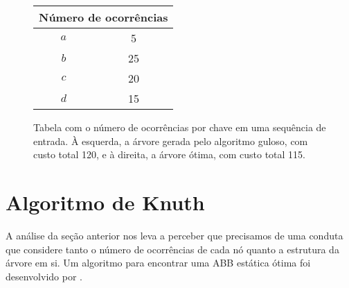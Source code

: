 \begin{figure}[h]
  \centering
  \begin{minipage}[c]{0.35\textwidth}
    \centering
    \begin{tabular}{|c|c|}
    \hline
    \multicolumn{2}{|c|}{\textbf{Número de ocorrências}} \\
    \hline
    \textbf{$a$} & 5 \\
    $b$ & 25 \\
    $c$ & 20 \\
    $d$ & 15 \\
    \hline
    \end{tabular}
    \end{minipage}
  \begin{minipage}[c]{0.3\textwidth}
  \centering
  \end{minipage}
  \begin{minipage}[c]{0.3\textwidth}
  \centering
  \end{minipage}
  \caption{Tabela com o número de ocorrências por chave em uma sequência de entrada. À esquerda, a árvore gerada pelo algoritmo guloso, com custo total 120, e à direita, a árvore ótima, com custo total 115.}
\label{fig:caso-guloso-subotimo}
\end{figure}

\section{Algoritmo de Knuth}

A análise da seção anterior nos leva a perceber que precisamos de uma conduta que considere tanto o número de ocorrências de cada nó quanto a estrutura da árvore em si. Um algoritmo para encontrar uma ABB estática ótima foi desenvolvido por \cite{knuth}.

